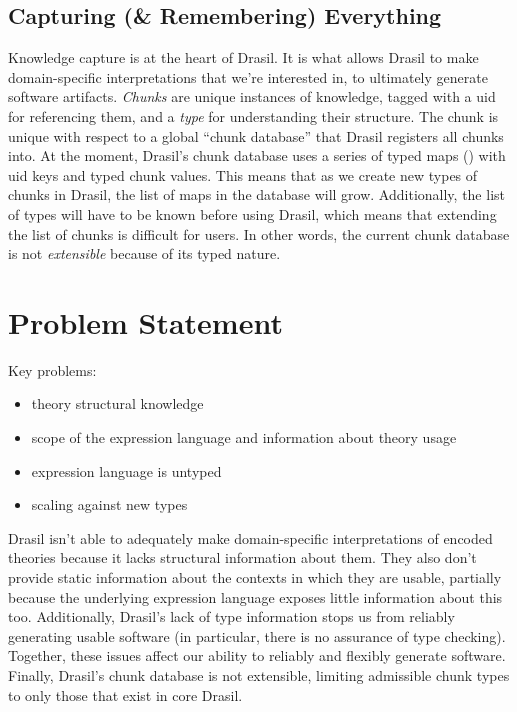 \subsection{Capturing (\& Remembering) Everything}
\label{chap:intro:sec:drasil:subsec:capturing-and-remembering-everything}

Knowledge capture is at the heart of Drasil. It is what allows Drasil to make
domain-specific interpretations that we're interested in, to ultimately generate
software artifacts. \textit{Chunks} are unique instances of knowledge, tagged
with a \acs{uid} for referencing them, and a \textit{type} for understanding
their structure. The chunk is unique with respect to a global ``chunk database''
that Drasil registers all chunks into. At the moment, Drasil's chunk database
uses a series of typed maps () with \acs{uid} keys
and typed chunk values. This means that as we create new types of chunks in
Drasil, the list of maps in the database will grow. Additionally, the list of
types will have to be known before using Drasil, which means that extending the
list of chunks is difficult for users. In other words, the current chunk
database is not \textit{extensible} because of its typed nature.

\section{Problem Statement}
\label{chap:intro:sec:problem-statement}

\begin{writingdirectives}
      \item Key problems:
      \begin{itemize}
            \item theory structural knowledge
            \item scope of the expression language and information about theory usage
            \item expression language is untyped
            \item scaling against new types
      \end{itemize}
\end{writingdirectives}

Drasil isn't able to adequately make domain-specific interpretations of encoded
theories because it lacks structural information about them. They also don't
provide static information about the contexts in which they are usable,
partially because the underlying expression language exposes little information
about this too. Additionally, Drasil's lack of type information stops us from
reliably generating usable software (in particular, there is no assurance of
type checking). Together, these issues affect our ability to reliably and
flexibly generate software. Finally, Drasil's chunk database is not extensible,
limiting admissible chunk types to only those that exist in core Drasil.\\

